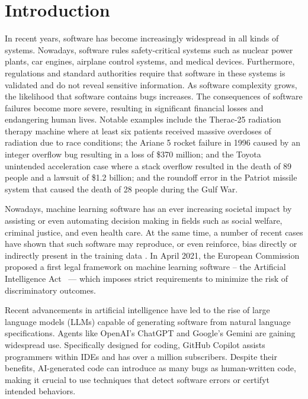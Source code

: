 \chapter{Introduction}

In recent years, software has become increasingly widespread in all kinds of systems.
Nowadays, software rules safety-critical systems such as nuclear power plants, car engines, airplane control systems, and medical devices.
Furthermore, regulations and standard authorities require that software in these systems is validated and do not reveal sensitive information.
As software complexity grows, the likelihood that software contains bugs increases.
The consequences of software failures become more severe, resulting in significant financial losses and endangering human lives.
Notable examples include the Therac-25 radiation therapy machine where at least six patients received massive overdoses of radiation due to race conditions; the Ariane 5 rocket failure in 1996 caused by an integer overflow bug resulting in a loss of \$370 million; and the Toyota unintended acceleration case where a stack overflow resulted in the death of 89 people and a lawsuit of \$1.2 billion; and the roundoff error in the Patriot missile system that caused the death of 28 people during the Gulf War.

Nowadays, machine learning software has an ever increasing societal impact by assisting or even automating decision making in fields such as social welfare, criminal justice, and even health care.
At the same time, a number of recent cases have shown that such software may reproduce, or even reinforce, bias directly or indirectly present in the training data \cite{BuolamwiniGebru2018,KayMatuszek2015,COMPAS,ObermeyerPowers2019}.
In April 2021, the European Commission proposed a first legal framework on machine learning software -- the Artificial Intelligence Act~\cite{ArtIntAct}
--- which imposes strict requirements to minimize the risk of discriminatory outcomes.

Recent advancements in artificial intelligence have led to the rise of large language models (LLMs) capable of generating software from natural language specifications. Agents like OpenAI's ChatGPT and Google's Gemini are gaining widespread use. Specifically designed for coding, GitHub Copilot assists programmers within IDEs and has over a million subscribers. Despite their benefits, AI-generated code can introduce as many bugs as human-written code, making it crucial to use techniques that detect software errors or certifyt intended behaviors.

